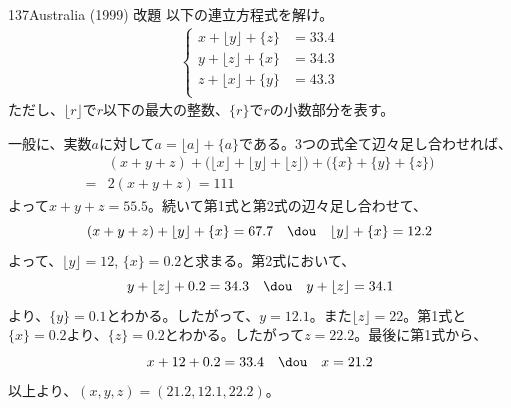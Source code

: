 \begin{prob}{137}{\maru}{Australia (1999) 改題}
 以下の連立方程式を解け。
 \begin{align*}
  \left\{
  \begin{aligned}
   x+\lfloor y \rfloor + \{z\} &= 33.4 \\
   y+\lfloor z \rfloor + \{x\} &= 34.3 \\
   z+\lfloor x \rfloor + \{y\} &= 43.3 \\
  \end{aligned}
  \right.
 \end{align*}
 ただし、$\lfloor r \rfloor$で$r$以下の最大の整数、$\{r\}$で$r$の小数部分を表す。
\end{prob}
一般に、実数$a$に対して$a=\lfloor a \rfloor+ \{a\}$である。3つの式全て辺々足し合わせれば、
\begin{align*}
 &(x+y+z)+\bigl(\lfloor x\rfloor+\lfloor y\rfloor +\lfloor z\rfloor\bigr) + \bigl(\{x\}+\{y\}+\{z\}\bigr) \\
 =&2(x+y+z)= 111
\end{align*}
よって$x+y+z=55.5$。続いて第1式と第2式の辺々足し合わせて、
\[ (x+y+z)+\lfloor y\rfloor+\{x\}=67.7 \quad\dou\quad \lfloor y\rfloor+\{x\}=12.2 \]
よって、$\lfloor y\rfloor=12$, $\{x\}=0.2$と求まる。第2式において、
\[ y+\lfloor z\rfloor + 0.2=34.3 \quad\dou\quad y+\lfloor z\rfloor =34.1 \]
より、$\{y\}=0.1$とわかる。したがって、$y=12.1$。また$\lfloor z\rfloor=22$。第1式と$\{x\}=0.2$より、$\{z\}=0.2$とわかる。したがって$z=22.2$。最後に第1式から、
\[ x+12+0.2=33.4 \quad\dou\quad x=21.2 \]
以上より、$(x, y, z)=(21.2, 12.1, 22.2)$。